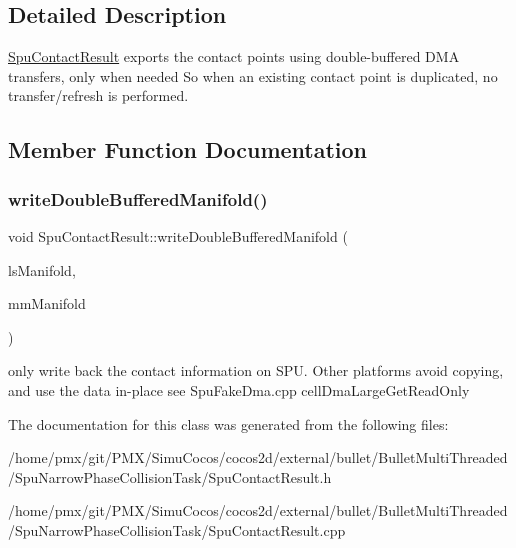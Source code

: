 \subsection{Detailed Description}
\hyperlink{classSpuContactResult}{Spu\+Contact\+Result} exports the contact points using double-\/buffered D\+MA transfers, only when needed So when an existing contact point is duplicated, no transfer/refresh is performed. 

\subsection{Member Function Documentation}
\mbox{\label{classSpuContactResult_a4a8870acdf01594bed6377d450583a95}} 
\subsubsection{\texorpdfstring{write\+Double\+Buffered\+Manifold()}{writeDoubleBufferedManifold()}}
{\footnotesize\ttfamily void Spu\+Contact\+Result\+::write\+Double\+Buffered\+Manifold (\begin{DoxyParamCaption}\item[{bt\+Persistent\+Manifold $\ast$}]{ls\+Manifold,  }\item[{bt\+Persistent\+Manifold $\ast$}]{mm\+Manifold }\end{DoxyParamCaption})}

only write back the contact information on S\+PU. Other platforms avoid copying, and use the data in-\/place see Spu\+Fake\+Dma.\+cpp \textquotesingle{}cell\+Dma\+Large\+Get\+Read\+Only\textquotesingle{} 

The documentation for this class was generated from the following files\+:\begin{DoxyCompactItemize}
\item 
/home/pmx/git/\+P\+M\+X/\+Simu\+Cocos/cocos2d/external/bullet/\+Bullet\+Multi\+Threaded/\+Spu\+Narrow\+Phase\+Collision\+Task/Spu\+Contact\+Result.\+h\item 
/home/pmx/git/\+P\+M\+X/\+Simu\+Cocos/cocos2d/external/bullet/\+Bullet\+Multi\+Threaded/\+Spu\+Narrow\+Phase\+Collision\+Task/Spu\+Contact\+Result.\+cpp\end{DoxyCompactItemize}
